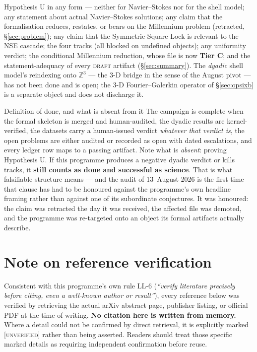 \documentclass[11pt,a4paper]{article}
\newcommand{\tC}{\textcolor{TierC}{\textbf{Tier C}}}
\newcommand{\Z}{\mathbb{Z}}
\theoremstyle{definition}
\theoremstyle{plain}
\begin{document}
Hypothesis U in any form --- neither for Navier--Stokes nor for the shell model; any statement
about actual Navier--Stokes solutions; any claim that the formalisation reduces, restates, or
bears on the Millennium problem (retracted, \S\ref{sec:problem}); any claim that the
Symmetric-Square Lock is relevant to the NSE cascade; the four tracks (all blocked on undefined
objects); any uniformity verdict; the conditional Millennium reduction, whose file is now \tC{};
and the statement-adequacy of every \textsc{draft} artifact (\S\ref{sec:summary}). The
\emph{dyadic} shell model's reindexing onto $\Z^3$ --- the 3-D bridge in the sense of the August
pivot --- has not been done and is open; the 3-D Fourier--Galerkin operator of
\S\ref{sec:opsixb} is a separate object and does not discharge it.

\begin{keybox}{Definition of done, and what is absent from it}
The campaign is complete when the formal skeleton is merged and human-audited, the dyadic
results are kernel-verified, the datasets carry a human-issued verdict \emph{whatever that
verdict is}, the open problems are either audited or recorded as open with dated escalations,
and every ledger row maps to a passing artifact. Note what is \emph{absent}: proving
Hypothesis U. If this programme produces a negative dyadic verdict or kills tracks, it
\textbf{still counts as done and successful as science}. That is what falsifiable structure
means --- and the audit of 13~August 2026 is the first time that clause has had to be honoured
against the programme's own headline framing rather than against one of its subordinate
conjectures. It was honoured: the claim was retracted the day it was received, the affected
file was demoted, and the programme was re-targeted onto an object its formal artifacts
actually describe.
\end{keybox}

\section*{Note on reference verification}

Consistent with this programme's own rule LL-6 (\emph{``verify literature precisely before
citing, even a well-known author or result''}), every reference below was verified by
retrieving the actual arXiv abstract page, publisher listing, or official PDF at the time of
writing. \textbf{No citation here is written from memory.} Where a detail could not be
confirmed by direct retrieval, it is explicitly marked \textsc{[unverified]} rather than
being asserted. Readers should treat those specific marked details as requiring independent
confirmation before reuse.
\end{document}
